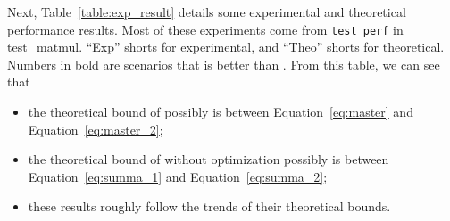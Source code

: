 Next, Table~\ref{table:exp_result} details some experimental and theoretical performance results.
%
Most of these experiments come from \texttt{test\_perf} in test\_matmul.
%
``Exp'' shorts for experimental, and ``Theo'' shorts for theoretical.
%
Numbers in bold are scenarios that \summa is better than \master.
%
From this table, we can see that 
\begin{itemize}
  \item the theoretical bound of \master possibly is between Equation~\ref{eq:master} and Equation~\ref{eq:master_2};
  \item the theoretical bound of \summa without optimization possibly is between Equation~\ref{eq:summa_1} and Equation~\ref{eq:summa_2};
  \item these results roughly follow the trends of their theoretical bounds.
\end{itemize}



